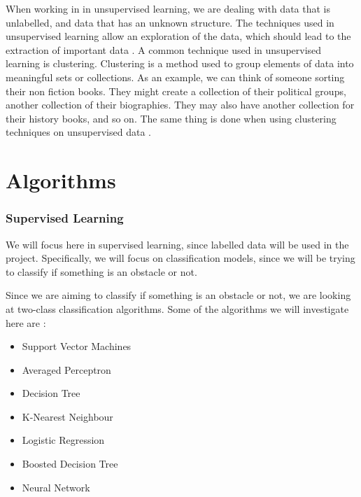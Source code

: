 \documentclass[conference]{IEEEtran}
\begin{document}
When working in in unsupervised learning, we are dealing with data that is unlabelled, and data that has an unknown structure. The techniques used in unsupervised learning allow an exploration of the data, which should lead to the extraction of important data \cite{pythonML}. A common technique used in unsupervised learning is clustering. Clustering is a method used to group elements of data into meaningful sets or collections. As an example, we can think of someone sorting their non fiction books. They might create a collection of their political groups, another collection of their biographies. They may also have another collection for their history books, and so on. The same thing is done when using clustering techniques on unsupervised data \cite{google1}.  

\section{Algorithms}
\subsubsection{Supervised Learning}
We will focus here in supervised learning, since labelled data will be used in the project. Specifically, we will focus on classification models, since we will be trying to classify if something is an obstacle or not.

Since we are aiming to classify if something is an obstacle or not, we are looking at two-class classification algorithms. Some of the algorithms we will investigate here are \cite{azure}:


\begin{itemize}
    \item Support Vector Machines
    \item Averaged Perceptron
    \item Decision Tree
    \item K-Nearest Neighbour
    \item Logistic Regression
    \item Boosted Decision Tree
    \item Neural Network
\end{itemize}




\printbibliography
\vspace{12pt}
\end{document}
